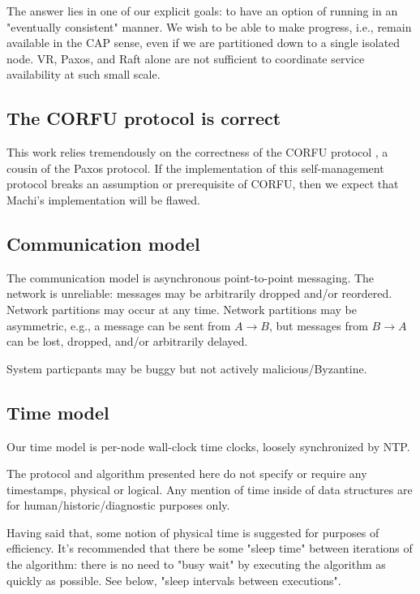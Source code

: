 \documentclass[preprint,10pt]{sigplanconf}
\begin{document}
The answer lies in one of our explicit goals: to have an option of
running in an "eventually consistent" manner.  We wish to be able to
make progress, i.e., remain available in the CAP sense, even if we are
partitioned down to a single isolated node.  VR, Paxos, and Raft
alone are not sufficient to coordinate service availability at such
small scale.

\subsection{The CORFU protocol is correct}

This work relies tremendously on the correctness of the CORFU
protocol \cite{corfu1}, a cousin of the Paxos protocol.
If the implementation of
this self-management protocol breaks an assumption or prerequisite of
CORFU, then we expect that Machi's implementation will be flawed.

\subsection{Communication model}

The communication model is asynchronous point-to-point messaging.
The network is unreliable: messages may be arbitrarily dropped and/or
reordered.  Network partitions may occur at any time.
Network partitions may be asymmetric, e.g., a message can be sent
from $A \rightarrow B$, but messages from $B \rightarrow A$ can be
lost, dropped, and/or arbitrarily delayed.

System particpants may be buggy but not actively malicious/Byzantine.

\subsection{Time model}
\label{sub:time-model}

Our time model is per-node wall-clock time clocks, loosely
synchronized by NTP.

The protocol and algorithm presented here do not specify or require any
timestamps, physical or logical.  Any mention of time inside of data
structures are for human/historic/diagnostic purposes only.

Having said that, some notion of physical time is suggested for
purposes of efficiency.  It's recommended that there be some "sleep
time" between iterations of the algorithm: there is no need to "busy
wait" by executing the algorithm as quickly as possible.  See below,
"sleep intervals between executions".
\end{document}
